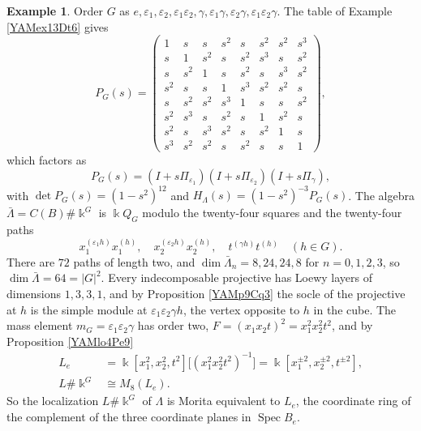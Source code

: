 \documentclass[reqno]{amsart}
\numberwithin{equation}{section}
\theoremstyle{definition}
\newtheorem{example}[equation]{Example}
\theoremstyle{remark}
\theoremstyle{plain}
\newcommand{\kk}{\Bbbk}
\begin{document}
\begin{example}
Order $G$ as $e,\varepsilon_1,\varepsilon_2,\varepsilon_1\varepsilon_2,\gamma,\varepsilon_1\gamma,\varepsilon_2\gamma,\varepsilon_1\varepsilon_2\gamma$. The table of Example \ref{YAMex13Dt6} gives
\[
P_G(s)=\begin{pmatrix}
1&s&s&s^2&s&s^2&s^2&s^3\\
s&1&s^2&s&s^2&s^3&s&s^2\\
s&s^2&1&s&s^2&s&s^3&s^2\\
s^2&s&s&1&s^3&s^2&s^2&s\\
s&s^2&s^2&s^3&1&s&s&s^2\\
s^2&s^3&s&s^2&s&1&s^2&s\\
s^2&s&s^3&s^2&s&s^2&1&s\\
s^3&s^2&s^2&s&s^2&s&s&1
\end{pmatrix},
\]
which factors as
\[
P_G(s)=(I+s\Pi_{\varepsilon_1})(I+s\Pi_{\varepsilon_2})(I+s\Pi_\gamma),
\]
with $\det P_G(s)=(1-s^2)^{12}$ and $H_\Lambda(s)=(1-s^2)^{-3}P_G(s)$. The algebra $\bar\Lambda=C(B)\#\kk^G$ is $\kk Q_G$ modulo the twenty-four squares and the twenty-four paths
\[
x_1^{(\varepsilon_1h)}x_1^{(h)},\quad x_2^{(\varepsilon_2h)}x_2^{(h)},\quad t^{(\gamma h)}t^{(h)}\quad(h\in G).
\]
There are $72$ paths of length two, and $\dim\bar\Lambda_n=8,24,24,8$ for $n=0,1,2,3$, so $\dim\bar\Lambda=64=|G|^2$. Every indecomposable projective has Loewy layers of dimensions $1,3,3,1$, and by Proposition \ref{YAMp9Cq3} the socle of the projective at $h$ is the simple module at $\varepsilon_1\varepsilon_2\gamma h$, the vertex opposite to $h$ in the cube. The mass element $m_G=\varepsilon_1\varepsilon_2\gamma$ has order two, $F=(x_1x_2t)^2=x_1^2x_2^2t^2$, and by Proposition \ref{YAMlo4Pe9}
\[
\begin{aligned}
L_e&=\kk[x_1^2,x_2^2,t^2]\big[(x_1^2x_2^2t^2)^{-1}\big]=\kk[x_1^{\pm2},x_2^{\pm2},t^{\pm2}],\\
L\#\kk^G&\cong M_8(L_e).
\end{aligned}
\]
So the localization $L\#\kk^G$ of $\Lambda$ is Morita equivalent to $L_e$, the coordinate ring of the complement of the three coordinate planes in $\operatorname{Spec}B_e$.
\end{example}
\end{document}
